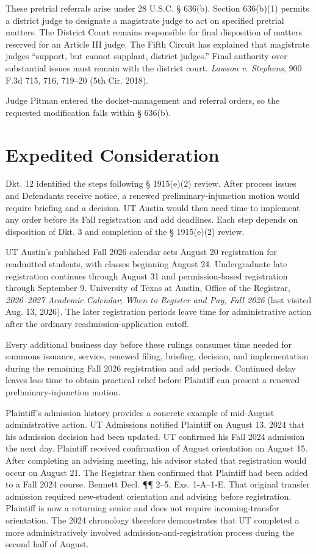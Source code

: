 \documentclass[12pt]{article}
\begin{document}
These pretrial referrals arise under 28 U.S.C. § 636(b). Section 636(b)(1) permits a district judge to designate a magistrate judge to act on specified pretrial matters. The District Court remains responsible for final disposition of matters reserved for an Article III judge. The Fifth Circuit has explained that magistrate judges ``support, but cannot supplant, district judges.'' Final authority over substantial issues must remain with the district court. \textit{Lawson v. Stephens}, 900 F.3d 715, 716, 719--20 (5th Cir. 2018).

Judge Pitman entered the docket-management and referral orders, so the requested modification falls within § 636(b).

\section*{Expedited Consideration}

Dkt. 12 identified the steps following § 1915(e)(2) review. After process issues and Defendants receive notice, a renewed preliminary-injunction motion would require briefing and a decision. UT Austin would then need time to implement any order before its Fall registration and add deadlines. Each step depends on disposition of Dkt. 3 and completion of the § 1915(e)(2) review.

UT Austin's published Fall 2026 calendar sets August 20 registration for readmitted students, with classes beginning August 24. Undergraduate late registration continues through August 31 and permission-based registration through September 9. University of Texas at Austin, Office of the Registrar, \textit{2026--2027 Academic Calendar}; \textit{When to Register and Pay, Fall 2026} (last visited Aug. 13, 2026). The later registration periods leave time for administrative action after the ordinary readmission-application cutoff.

Every additional business day before these rulings consumes time needed for summons issuance, service, renewed filing, briefing, decision, and implementation during the remaining Fall 2026 registration and add periods. Continued delay leaves less time to obtain practical relief before Plaintiff can present a renewed preliminary-injunction motion.

Plaintiff's admission history provides a concrete example of mid-August administrative action. UT Admissions notified Plaintiff on August 13, 2024 that his admission decision had been updated. UT confirmed his Fall 2024 admission the next day. Plaintiff received confirmation of August orientation on August 15. After completing an advising meeting, his advisor stated that registration would occur on August 21. The Registrar then confirmed that Plaintiff had been added to a Fall 2024 course. Bennett Decl. ¶¶ 2--5, Exs. 1-A--1-E. That original transfer admission required new-student orientation and advising before registration. Plaintiff is now a returning senior and does not require incoming-transfer orientation. The 2024 chronology therefore demonstrates that UT completed a more administratively involved admission-and-registration process during the second half of August.
\end{document}
